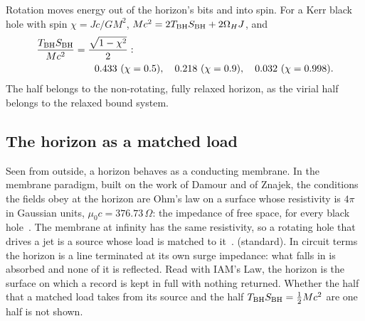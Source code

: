 Rotation moves energy out of the horizon's bits and into spin. For a Kerr black hole with spin $\chi=Jc/GM^2$, $Mc^2=2T_{\rm BH}S_{\rm BH}+2\Omega_HJ$, and
\begin{equation}
\begin{aligned}\frac{T_{\rm BH}S_{\rm BH}}{Mc^2}&=\frac{\sqrt{1-\chi^2}}{2}:\\&\qquad 0.433\ (\chi=0.5),\quad 0.218\ (\chi=0.9),\quad 0.032\ (\chi=0.998).\end{aligned}
\end{equation}
The half belongs to the non-rotating, fully relaxed horizon, as the virial half belongs to the relaxed bound system. \derived

\subsection{The horizon as a matched load}\label{sec:bh_membrane}
Seen from outside, a horizon behaves as a conducting membrane. In the membrane paradigm, built on the work of Damour and of Znajek, the
conditions the fields obey at the horizon are Ohm's law on a surface whose resistivity is $4\pi$ in Gaussian units, $\mu_0c=376.73\,\Omega$: the
impedance of free space, for every black hole~\cite{ThornePriceMacdonald1986}. The membrane at infinity has the same resistivity, so a
rotating hole that drives a jet is a source whose load is matched to it~\cite{Penna2015}. \derived{} (standard). In circuit terms the horizon is a
line terminated at its own surge impedance: what falls in is absorbed and none of it is reflected. Read with IAM's Law, the horizon is the
surface on which a record is kept in full with nothing returned. \interp{} Whether the half that a matched load takes from its source and the
half $T_{\rm BH}S_{\rm BH}=\tfrac12Mc^2$ are one half is not shown. \conjecture

